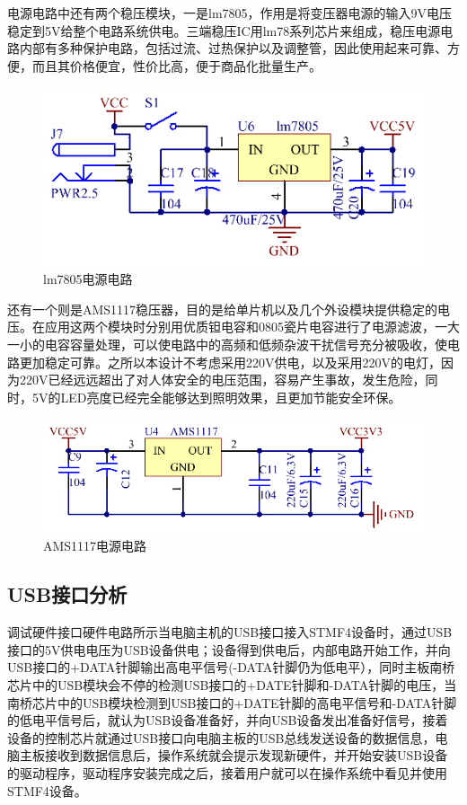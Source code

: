 \documentclass[UTF8]{ctexart}
\begin{document}
电源电路中还有两个稳压模块，一是lm7805，作用是将变压器电源的输入9V电压稳定到5V给整个电路系统供电。三端稳压IC用lm78系列芯片来组成，稳压电源电路内部有多种保护电路，包括过流、过热保护以及调整管，因此使用起来可靠、方便，而且其价格便宜，性价比高，便于商品化批量生产。

\begin{figure}[h]
	\centering
	\includegraphics[scale = 0.7]{9}
	\caption{lm7805电源电路}
\end{figure}
还有一个则是AMS1117稳压器，目的是给单片机以及几个外设模块提供稳定的电压。在应用这两个模块时分别用优质钽电容和0805瓷片电容进行了电源滤波，一大一小的电容容量处理，可以使电路中的高频和低频杂波干扰信号充分被吸收，使电路更加稳定可靠。之所以本设计不考虑采用220V供电，以及采用220V的电灯，因为220V已经远远超出了对人体安全的电压范围，容易产生事故，发生危险，同时，5V的LED亮度已经完全能够达到照明效果，且更加节能安全环保。
\begin{figure}[h]
	\centering
	\includegraphics[scale = 0.7]{8}
	\caption{AMS1117电源电路}
\end{figure}
\subsection{USB接口分析}
调试硬件接口硬件电路所示当电脑主机的USB接口接入STMF4设备时，通过USB接口的5V供电电压为USB设备供电；设备得到供电后，内部电路开始工作，并向USB接口的+DATA针脚输出高电平信号(-DATA针脚仍为低电平），同时主板南桥芯片中的USB模块会不停的检测USB接口的+DATE针脚和-DATA针脚的电压，当南桥芯片中的USB模块检测到USB接口的+DATE针脚的高电平信号和-DATA针脚的低电平信号后，就认为USB设备准备好，并向USB设备发出准备好信号，接着设备的控制芯片就通过USB接口向电脑主板的USB总线发送设备的数据信息，电脑主板接收到数据信息后，操作系统就会提示发现新硬件，并开始安装USB设备的驱动程序，驱动程序安装完成之后，接着用户就可以在操作系统中看见并使用STMF4设备。
\end{document}
